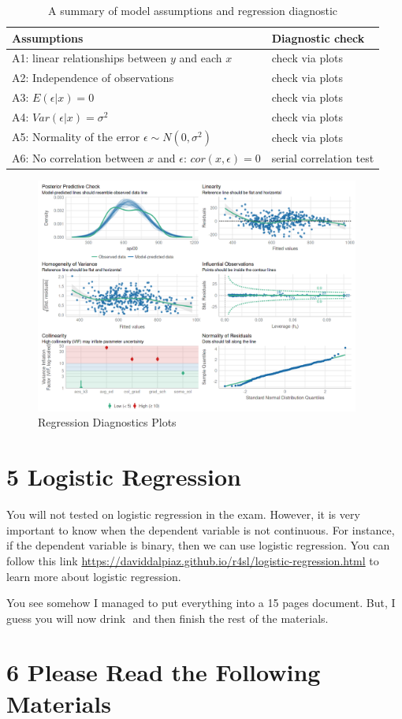 \documentclass[11pt]{article}
\theoremstyle{definition}
\begin{document}
\begin{table}[!htb]
  \centering
  \begin{tabular}{ll}
    \hline 
    \hline 
    Assumptions & Diagnostic check \\ 
    \hline 
    A1: linear relationships between $y$ and each $x$ & check via plots\\
    A2: Independence of observations & check via plots  \\
    A3: $E(\epsilon | x) = 0$ & check via plots \\ 
    A4: $Var(\epsilon | x) = \sigma^2$ & check via plots  \\
    A5: Normality of the error $\epsilon \sim N(0, \sigma^2)$ & check via plots  \\
    A6: No correlation between $x$ and $\epsilon$: $cor(x, \epsilon)=0$ & serial correlation test \\ 
    \hline 
  \end{tabular}
  \caption{A summary of model assumptions and regression diagnostic}
\end{table}


\begin{figure}[!htbp]
  \centering
  \includegraphics[width=0.95\textwidth]{./figures/reg_figure4.png}
  \caption{Regression Diagnostics Plots}
\end{figure}


\section{5 Logistic Regression}

You will not tested on logistic regression in the exam. However, it is very important
to know when the dependent variable is not continuous. For instance, if the dependent
variable is binary, then we can use logistic regression. You can follow this link \url{https://daviddalpiaz.github.io/r4sl/logistic-regression.html}
to learn more about logistic regression.

You see somehow I managed to put everything into a 15 pages document.
But, I guess you will now drink \Coffeecup  $ $ and then finish the rest of the materials.


\section{6 Please Read the Following Materials}
\end{document}
